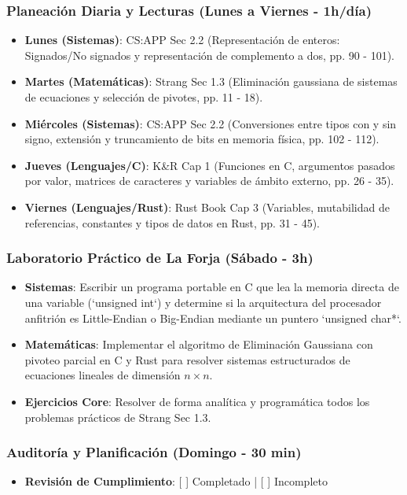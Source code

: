 \documentclass[11pt, a4paper]{article}
\begin{document}
\subsubsection{Planeación Diaria y Lecturas (Lunes a Viernes - 1h/día)}
\begin{itemize}
    \item \textbf{Lunes (Sistemas)}: CS:APP Sec 2.2 (Representación de enteros: Signados/No signados y representación de complemento a dos, pp. 90 - 101).
    \item \textbf{Martes (Matemáticas)}: Strang Sec 1.3 (Eliminación gaussiana de sistemas de ecuaciones y selección de pivotes, pp. 11 - 18).
    \item \textbf{Miércoles (Sistemas)}: CS:APP Sec 2.2 (Conversiones entre tipos con y sin signo, extensión y truncamiento de bits en memoria física, pp. 102 - 112).
    \item \textbf{Jueves (Lenguajes/C)}: K\&R Cap 1 (Funciones en C, argumentos pasados por valor, matrices de caracteres y variables de ámbito externo, pp. 26 - 35).
    \item \textbf{Viernes (Lenguajes/Rust)}: Rust Book Cap 3 (Variables, mutabilidad de referencias, constantes y tipos de datos en Rust, pp. 31 - 45).
\end{itemize}

\subsubsection{Laboratorio Práctico de La Forja (Sábado - 3h)}
\begin{itemize}
    \item \textbf{Sistemas}: Escribir un programa portable en C que lea la memoria directa de una variable (`unsigned int`) y determine si la arquitectura del procesador anfitrión es Little-Endian o Big-Endian mediante un puntero `unsigned char*`.
    \item \textbf{Matemáticas}: Implementar el algoritmo de Eliminación Gaussiana con pivoteo parcial en C y Rust para resolver sistemas estructurados de ecuaciones lineales de dimensión $n \times n$.
    \item \textbf{Ejercicios Core}: Resolver de forma analítica y programática todos los problemas prácticos de Strang Sec 1.3.
\end{itemize}

\subsubsection{Auditoría y Planificación (Domingo - 30 min)}
\begin{itemize}
    \item \textbf{Revisión de Cumplimiento}: [ ] Completado | [ ] Incompleto
\end{itemize}
\end{document}
